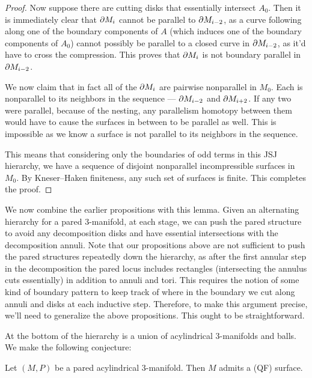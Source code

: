 \begin{proof}
Now suppose there are cutting disks that essentially intersect $A_0$. Then it
is immediately clear that $\partial M_i$ cannot be parallel to $\partial M_{i-2}$, as
a curve following along one of the boundary components of $A$ (which induces
one of the boundary components of $A_0$) cannot possibly be parallel to
a closed curve in $\partial M_{i-2}$, as it'd have to cross the compression. This
proves that $\partial M_i$ is not boundary parallel in $\partial M_{i-2}$.

We now claim that in fact all of the $\partial M_i$ are pairwise nonparallel in
$M_0$.  Each is nonparallel to its neighbors in the sequence --- $\partial M_{i-2}$
and $\partial M_{i+2}$.  If any two were parallel, because of the nesting, any
parallelism homotopy between them would have to cause the surfaces in between
to be parallel as well. This is impossible as we know a surface is not parallel
to its neighbors in the sequence.

This means that considering only the boundaries of odd terms in this JSJ
hierarchy, we have a sequence of disjoint nonparallel incompressible surfaces
in $M_0$. By Kneser--Haken finiteness, any such set of surfaces is finite. This
completes the proof.

\end{proof}

We now combine the earlier propositions with this lemma. Given an alternating
hierarchy for a pared $3$-manifold, at each stage, we can push the pared
structure to avoid any decomposition disks and have essential intersections
with the decomposition annuli. Note that our propositions above are not
sufficient to push the pared structures repeatedly down the hierarchy, as after
the first annular step in the decomposition the pared locus includes rectangles
(intersecting the annulus cuts essentially) in addition to annuli and tori.
This requires the notion of some kind of boundary pattern to keep track of
where in the boundary we cut along annuli and disks at each inductive step.
Therefore, to make this argument precise, we'll need to generalize the above
propositions. This ought to be straightforward.

At the bottom of the hierarchy is a union of acylindrical $3$-manifolds and
balls. We make the following conjecture:

\begin{conj}

Let $(M,P)$ be a pared acylindrical $3$-manifold. Then $M$ admits a (QF)
surface.

\end{conj}

